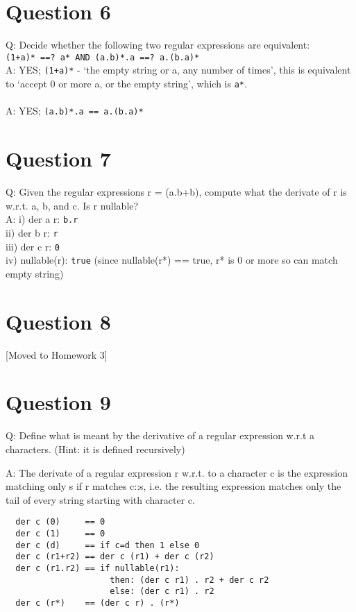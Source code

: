 \documentclass[english]{scrartcl}
\begin{document}
\section*{Question 6}
Q: Decide whether the following two regular expressions are equivalent: \\
\verb|(1+a)* ==? a* AND (a.b)*.a ==? a.(b.a)*|
\\
A: YES; \verb|(1+a)*| - `the empty string or a, any number of times', this is equivalent to `accept 0 or more a, or the empty string', which is \verb~a*~. \\
\\
A: YES; \verb|(a.b)*.a == a.(b.a)*|

\section*{Question 7}
Q: Given the regular expressions r = (a.b+b), compute what the derivate of r is w.r.t. a, b, and c. Is r nullable? \\
A: i) der a r: \verb|b.r| \\
   ii) der b r: \verb|r| \\
   iii) der c r: \verb|0| \\
   iv) nullable(r): \verb|true| (since nullable(r*) == true, r* is 0 or more so can match empty string)

\section*{Question 8}
[Moved to Homework 3]

\section*{Question 9}
Q: Define what is meant by the derivative of a regular expression w.r.t a characters. (Hint: it is defined recursively)

A: The derivate of a regular expression r w.r.t. to a character c is the expression matching only s if r matches c::s, i.e. the resulting expression
matches only the tail of every string starting with character c.

\begin{verbatim}
  der c (0)     == 0
  der c (1)     == 0
  der c (d)     == if c=d then 1 else 0
  der c (r1+r2) == der c (r1) + der c (r2)
  der c (r1.r2) == if nullable(r1):
                     then: (der c r1) . r2 + der c r2
                     else: (der c r1) . r2
  der c (r*)    == (der c r) . (r*)
\end{verbatim}
\end{document}
